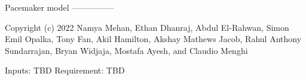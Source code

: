 Pacemaker model
---------------

Copyright (c) 2022
Namya Mehan, Ethan Dhanraj, Abdul El-Rahwan, Simon Emil Opalka, Tony Fan, Akil Hamilton, Akshay Mathews Jacob, Rahul Anthony Sundarrajan, Bryan Widjaja, Mostafa Ayesh, and Claudio Menghi

Inputs:      TBD
Requirement: TBD
